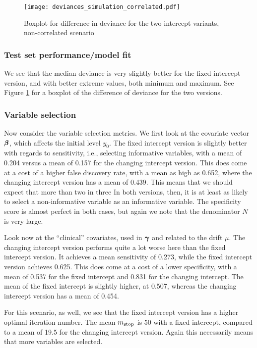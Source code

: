 \begin{figure}
\caption{Boxplot for difference in deviance for the two intercept variants, non-correlated scenario}
\label{fig:simulation-correlated-deviances-boxplot}
\centering\texttt{[image: deviances\_simulation\_correlated.pdf]}
\end{figure}

\subsubsection{Test set performance/model fit}
We see that the median deviance is very slightly better for the fixed intercept version, and with better extreme values, both minimum and maximum.
See Figure \ref{fig:simulation-correlated-deviances-boxplot} for a boxplot of the difference of deviance for the two versions.

\subsubsection{Variable selection}
Now consider the variable selection metrics.
We first look at the covariate vector $\boldsymbol{\beta}$, which affects the initial level $y_0$.
The fixed intercept version is slightly better with regards to sensitivity, i.e., selecting informative variables, with a mean of 0.204 versus a mean of 0.157 for the changing intercept version.
This does come at a cost of a higher false discovery rate, with a mean as high as 0.652, where the changing intercept version has a mean of 0.439.
This means that we should expect that more than two in three 
In both versions, then, it is at least as likely to select a non-informative variable as an informative variable.
The specificity score is almost perfect in both cases, but again we note that the denominator $N$ is very large.

Look now at the ``clinical'' covariates, used in $\boldsymbol{\gamma}$ and related to the drift $\mu$.
The changing intercept version performs quite a lot worse here than the fixed intercept version.
It achieves a mean sensitivity of 0.273, while the fixed intercept version achieves 0.625.
This does come at a cost of a lower specificity, with a mean of 0.537 for the fixed intercept and 0.831 for the changing intercept.
The mean of the fixed intercept is slightly higher, at 0.507, whereas the changing intercept version has a mean of 0.454.

For this scenario, as well, we see that the fixed intercept version has a higher optimal iteration number.
The mean $m_{\text{stop}}$ is 50 with a fixed intercept, compared to a mean of 19.5 for the changing intercept version.
Again this necessarily means that more variables are selected.

